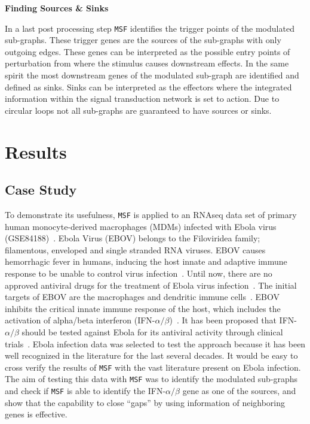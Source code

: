 \documentclass[10pt,a4paper,twocolumn]{article}
\begin{document}
\textbf{Finding Sources \& Sinks}

In a last post processing step \texttt{MSF} identifies the trigger
points of the modulated sub-graphs. These trigger genes are the
sources of the sub-graphs with only outgoing edges. These genes can be
interpreted as the possible entry points of perturbation from where
the stimulus causes downstream effects. In the same spirit the most
downstream genes of the modulated sub-graph are identified and defined
as sinks. Sinks can be interpreted as the effectors where the
integrated information within the signal transduction network is set
to action. Due to circular loops not all sub-graphs are guaranteed to
have sources or sinks.


\section*{Results}

\subsection*{Case Study}

To demonstrate its usefulness, \texttt{MSF} is applied to an RNAseq
data set of primary human monocyte-derived macrophages (MDMs) infected
with Ebola virus (GSE84188)~\cite{Olejnik}. Ebola Virus (EBOV) belongs
to the Filoviridea family; filamentous, enveloped and single stranded
RNA viruses. EBOV causes hemorrhagic fever in humans, inducing the
host innate and adaptive immune response to be unable to control virus
infection~\cite{Prins}. Until now, there are no approved antiviral
drugs for the treatment of Ebola virus infection~\cite{Konde,Rhein}.
The initial targets of EBOV are the macrophages and dendritic immune
cells~\cite{Falasca,Rhein}. EBOV inhibits the critical innate immune
response of the host, which includes the activation of alpha/beta
interferon (IFN-$\alpha / \beta$)~\cite{Prins,Konde,Cardenas}. It has
been proposed that IFN-$\alpha / \beta$ should be tested against Ebola
for its antiviral activity through clinical trials~\cite{Konde}. Ebola
infection data was selected to test the approach because it has been
well recognized in the literature for the last several decades. It
would be easy to cross verify the results of \texttt{MSF} with the
vast literature present on Ebola infection.  The aim of testing this
data with \texttt{MSF} was to identify the modulated sub-graphs and
check if \texttt{MSF} is able to identify the IFN-$\alpha / \beta$
gene as one of the sources, and show that the capability to close
``gaps'' by using information of neighboring genes is effective.
\end{document}
